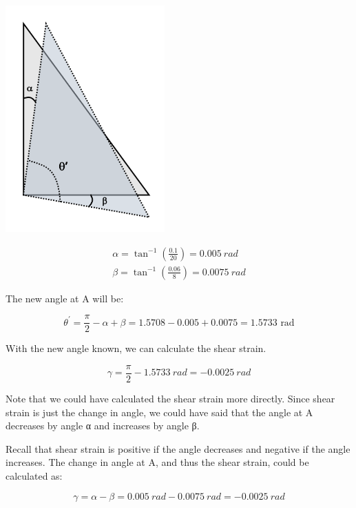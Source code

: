 \documentclass[
  letterpaper,
  DIV=11,
  numbers=noendperiod]{scrreprt}
\begin{document}
\begin{tcolorbox}
\begin{tcolorbox}
\begin{center}
\includegraphics[width=2.40625in,height=\textheight]{images/CH3 PNGs/example 3.4 part 2.png}
\end{center}

\[
\begin{gathered}
\alpha=\tan ^{-1}\left(\frac{0.1}{20}\right)=0.005{~rad} \\
\beta=\tan ^{-1}\left(\frac{0.06}{8}\right)=0.0075{~rad}
\end{gathered}
\]

The new angle at A will be:

\[
\theta^{\prime}=\frac{\pi}{2}-\alpha+\beta=1.5708-0.005+0.0075=1.5733 \text{ rad}
\]

With the new angle known, we can calculate the shear strain.

\[
\gamma=\frac{\pi}{2}-1.5733{~rad}=-0.0025{~rad}
\]

Note that we could have calculated the shear strain more directly. Since
shear strain is just the change in angle, we could have said that the
angle at A decreases by angle α and increases by angle β.

Recall that shear strain is positive if the angle decreases and negative
if the angle increases. The change in angle at A, and thus the shear
strain, could be calculated as:

\[
\gamma=\alpha-\beta=0.005{~rad}-0.0075{~rad}=-0.0025{~rad}
\]

\end{tcolorbox}

\end{tcolorbox}
\end{document}
